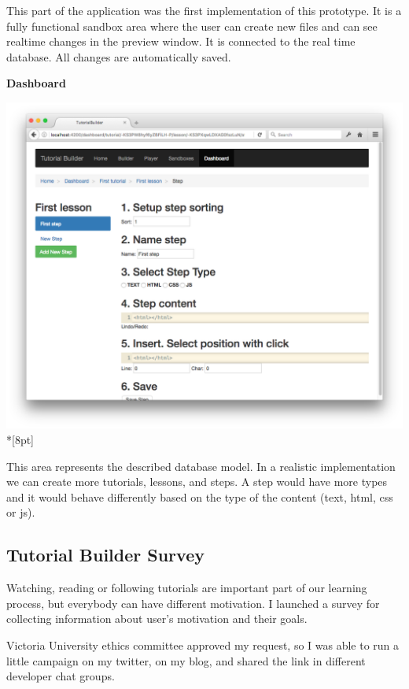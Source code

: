 \documentclass[11pt, a4paper, oneside, openright, medskipamount]{report}
\begin{document}
This part of the application was the first implementation of this prototype. It is a fully functional sandbox area where the user can create new files and can see realtime changes in the preview window. It is connected to the real time database. All changes are automatically saved.

\newpage

\textbf{Dashboard}

\includegraphics[width=1\textwidth]{assets/tour-screenshots/dashboard.png}\\*[8pt]

This area represents the described database model. In a realistic implementation we can create more tutorials, lessons, and steps. A step would have more types and it would behave differently based on the type of the content (text, html, css or js).

\newpage

\subsection{Tutorial Builder Survey}

Watching, reading or following tutorials are important part of our learning process, but everybody can have different motivation. I launched a survey for collecting information about user's motivation and their goals.

Victoria University ethics committee approved my request, so I was able to run a little campaign on my twitter, on my blog, and shared the link in different developer chat groups.
\end{document}
